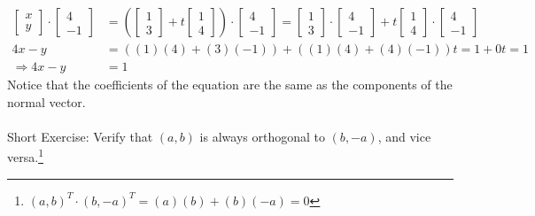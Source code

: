\begin{align*}
\begin{bmatrix}
x\\
y
\end{bmatrix}
\cdot
\begin{bmatrix}
4\\
-1
\end{bmatrix}
&=
\left(\begin{bmatrix}
1\\
3
\end{bmatrix}
+ t
\begin{bmatrix}
1 \\
4
\end{bmatrix}\right)
\cdot
\begin{bmatrix}
4\\
-1
\end{bmatrix}
=
\begin{bmatrix}
1\\
3
\end{bmatrix}
\cdot
\begin{bmatrix}
4\\
-1
\end{bmatrix}
+ t
\begin{bmatrix}
1 \\
4
\end{bmatrix} 
\cdot
\begin{bmatrix}
4\\
-1
\end{bmatrix}\\
4x - y &= ((1)(4) + (3)(-1)) + ((1)(4)+(4)(-1))t = 1 + 0t = 1 \\
\Rightarrow 4x - y &= 1
\end{align*}
Notice that the coefficients of the equation are the same as the components of the normal vector.\\
\\
Short Exercise: Verify that $(a, b)$ is always orthogonal to $(b, -a)$, and vice versa.\footnote{$(a, b)^T \cdot (b, -a)^T = (a)(b) + (b)(-a) = 0$}


